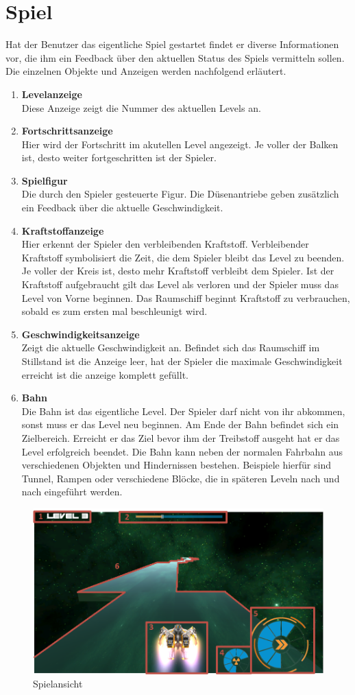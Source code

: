 \section{Spiel}
Hat der Benutzer das eigentliche Spiel gestartet findet er diverse Informationen vor, die ihm ein Feedback über den aktuellen Status des Spiels vermitteln sollen. Die einzelnen Objekte und Anzeigen werden nachfolgend erläutert.

\begin{enumerate}
  \item \textbf{Levelanzeige} \\
   Diese Anzeige zeigt die Nummer des aktuellen Levels an.
  \item \textbf{Fortschrittsanzeige} \\
  Hier wird der Fortschritt im akutellen Level angezeigt. Je voller der Balken ist, desto weiter fortgeschritten ist der Spieler.
  \item \textbf{Spielfigur} \\
  Die durch den Spieler gesteuerte Figur. Die Düsenantriebe geben zusätzlich ein Feedback über die aktuelle Geschwindigkeit.
  \item \textbf{Kraftstoffanzeige}\\
  Hier erkennt der Spieler den verbleibenden Kraftstoff. Verbleibender Kraftstoff symbolisiert die Zeit, die dem Spieler bleibt das Level zu beenden. Je voller der Kreis ist, desto mehr Kraftstoff verbleibt dem Spieler. Ist der Kraftstoff aufgebraucht gilt das Level als verloren und der Spieler muss das Level von Vorne beginnen. Das Raumschiff beginnt Kraftstoff zu verbrauchen, sobald es zum ersten mal beschleunigt wird.
  \item \textbf{Geschwindigkeitsanzeige}\\
  Zeigt die aktuelle Geschwindigkeit an. Befindet sich das Raumschiff im Stillstand ist die Anzeige leer, hat der Spieler die maximale Geschwindigkeit erreicht ist die anzeige komplett gefüllt. 
  \item \textbf{Bahn} \\
  Die Bahn ist das eigentliche Level. Der Spieler darf nicht von ihr abkommen, sonst muss er das Level neu beginnen. Am Ende der Bahn befindet sich ein Zielbereich. Erreicht er das Ziel bevor ihm der Treibstoff ausgeht hat er das Level erfolgreich beendet. Die Bahn kann neben der normalen Fahrbahn aus verschiedenen Objekten und Hindernissen bestehen. Beispiele hierfür sind Tunnel, Rampen oder verschiedene Blöcke, die in späteren Leveln nach und nach eingeführt werden.
\end{enumerate}

\begin{figure}
  \begin{center}
    \includegraphics[width=.9\textwidth]{gfx/anleitung/ingame2.png}
    \caption{Spielansicht}
  \end{center}
\end{figure}
